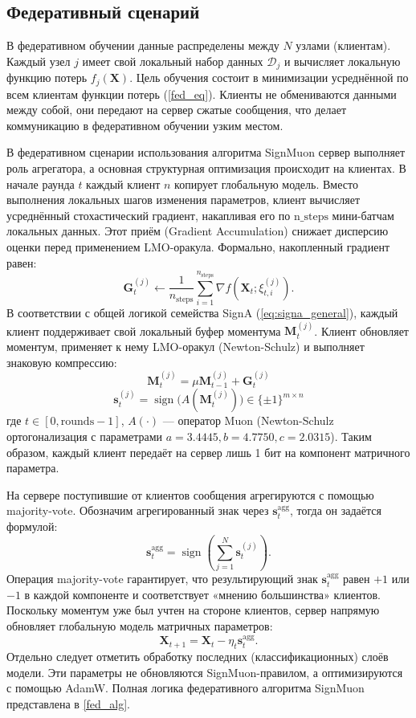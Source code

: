 \documentclass{article}
\begin{document}
\subsection{Федеративный сценарий}
В федеративном обучении данные распределены между $N$ узлами (клиентам). Каждый узел $j$ имеет свой локальный набор данных $\mathcal{D}_j$ и вычисляет локальную функцию потерь $f_j(\mathbf{X})$. Цель обучения состоит в минимизации усреднённой по всем клиентам функции потерь (\ref{fed_eq}). Клиенты не обмениваются данными между собой, они передают на сервер сжатые сообщения, что делает коммуникацию в федеративном обучении узким местом.

В федеративном сценарии использования алгоритма SignMuon сервер выполняет роль агрегатора, а основная структурная оптимизация происходит на клиентах. В начале раунда $t$ каждый клиент $n$ копирует глобальную модель. Вместо выполнения локальных шагов изменения параметров, клиент вычисляет усреднённый стохастический градиент, накапливая его по $\mathrm{n\_steps}$ мини-батчам локальных данных. Этот приём (Gradient Accumulation) снижает дисперсию оценки перед применением LMO-оракула. Формально, накопленный градиент равен:
$$
\mathbf{G}_t^{(j)}\gets\frac{1}{n_{\text{steps}}}\sum_{i=1}^{n_{\text{steps}}}\nabla f(\mathbf{X}_t;\xi_{t,i}^{(j)}).
$$
В соответствии с общей логикой семейства SignA (\ref{eq:signa_general}), каждый клиент поддерживает свой локальный буфер моментума $\mathbf{M}_t^{(j)}$. Клиент обновляет моментум, применяет к нему LMO-оракул (Newton-Schulz) и выполняет знаковую компрессию:
$$ \mathbf{M}_t^{(j)} = \mu \mathbf{M}_{t-1}^{(j)} + \mathbf{G}_t^{(j)} $$
$$ \mathbf{s}_t^{(j)} = \operatorname{sign}\bigl(A(\mathbf{M}_t^{(j)})\bigr) \in \{\pm 1\}^{m \times n} $$
где $t\in[0, \mathrm{rounds}-1]$, $A(\cdot)$ — оператор Muon (Newton-Schulz ортогонализация с параметрами $a=3.4445, b=4.7750, c=2.0315$). Таким образом, каждый клиент передаёт на сервер лишь 1 бит на компонент матричного параметра.

На сервере поступившие от клиентов сообщения агрегируются с помощью majority-vote. Обозначим агрегированный знак через $\mathbf{s}_t^{\mathrm{agg}}$, тогда он задаётся формулой:
\begin{equation}
\mathbf{s}_t^{\mathrm{agg}}=\operatorname{sign}\!\left(\sum_{j=1}^N \mathbf{s}_t^{(j)}\right).
\end{equation}
Операция majority-vote гарантирует, что результирующий знак $\mathbf{s}_t^{\mathrm{agg}}$ равен $+1$ или $-1$ в каждой компоненте и соответствует «мнению большинства» клиентов. Поскольку моментум уже был учтен на стороне клиентов, сервер напрямую обновляет глобальную модель матричных параметров:
\[
\mathbf{X}_{t+1} = \mathbf{X}_t - \eta_t \mathbf{s}_t^{\mathrm{agg}}.
\]
Отдельно следует отметить обработку последних (классификационных) слоёв  модели. Эти параметры не обновляются SignMuon-правилом, а оптимизируются с помощью AdamW. Полная логика федеративного алгоритма SignMuon представлена в \cref{fed_alg}.
\end{document}
